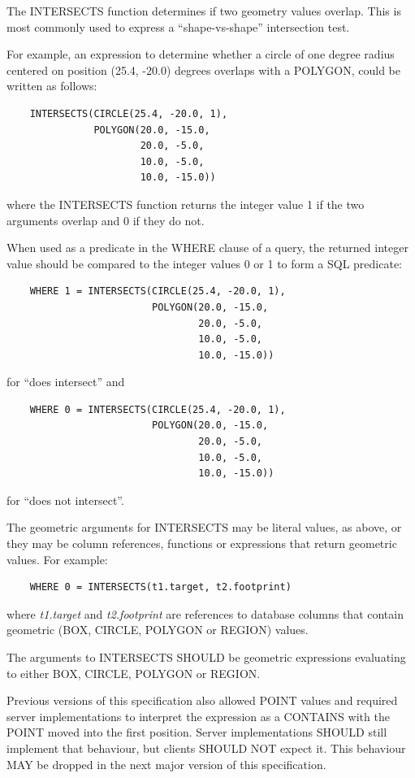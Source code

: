 \documentclass[11pt,a4paper]{ivoa}
\begin{document}
The INTERSECTS function determines if two geometry values overlap. This is
most commonly used to express a ``shape-vs-shape'' intersection test.

For example, an expression to determine whether a circle of one degree radius
centered on position (25.4, -20.0) degrees overlaps with a POLYGON, could be
written as follows:
\begin{verbatim}
    INTERSECTS(CIRCLE(25.4, -20.0, 1),
               POLYGON(20.0, -15.0,
                       20.0, -5.0,
                       10.0, -5.0,
                       10.0, -15.0))
\end{verbatim}
\noindent
where the INTERSECTS function returns the integer value 1 if the two arguments
overlap and 0 if they do not.

When used as a predicate in the WHERE clause of a query, the returned integer
value should be compared to the integer values 0 or 1 to form a SQL predicate:
\begin{verbatim}
    WHERE 1 = INTERSECTS(CIRCLE(25.4, -20.0, 1),
                         POLYGON(20.0, -15.0,
                                 20.0, -5.0,
                                 10.0, -5.0,
                                 10.0, -15.0))
\end{verbatim}
\noindent
for ``does intersect'' and
\begin{verbatim}
    WHERE 0 = INTERSECTS(CIRCLE(25.4, -20.0, 1),
                         POLYGON(20.0, -15.0,
                                 20.0, -5.0,
                                 10.0, -5.0,
                                 10.0, -15.0))
\end{verbatim}
\noindent
for ``does not intersect''.

The geometric arguments for INTERSECTS may be literal values, as above,
or they may be column references, functions or expressions that return
geometric values.
For example:
\begin{verbatim}
    WHERE 0 = INTERSECTS(t1.target, t2.footprint)
\end{verbatim}
where \textit{t1.target} and \textit{t2.footprint} are references to
database columns that contain geometric (BOX, CIRCLE, POLYGON or REGION) values.

The arguments to INTERSECTS SHOULD be geometric expressions evaluating to
either BOX, CIRCLE, POLYGON or REGION.

Previous versions of this specification also allowed POINT values and required
server implementations to interpret the expression as a CONTAINS with the POINT
moved into the first position. Server implementations SHOULD still implement
that behaviour, but clients SHOULD NOT expect it. This behaviour MAY be dropped
in the next major version of this specification.
\end{document}
